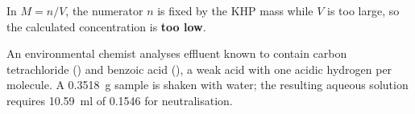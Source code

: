 \documentclass{apchem-exam}
\begin{document}
\begin{parts}
{\begin{apcanswer}
        In $M = n / V$, the numerator $n$ is fixed by the KHP mass while
        $V$ is too large, so the calculated concentration is
        \textbf{too low}.\end{apcanswer}}
\end{parts}

\begin{rubric}
\end{rubric}


An environmental chemist analyses effluent known to contain carbon
tetrachloride () and benzoic acid (), a weak acid with
one acidic hydrogen per molecule. A \SI{0.3518}{\gram} sample is shaken with
water; the resulting aqueous solution requires \SI{10.59}{\milli\litre} of
\SI{0.1546}{\Molar}  for neutralisation.
\end{document}
